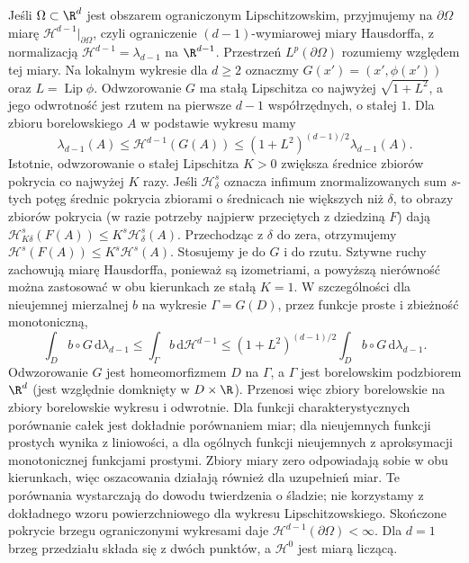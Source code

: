 \begin{definicja}
Jeśli $\Omega\subset\R^d$ jest obszarem ograniczonym Lipschitzowskim, przyjmujemy na $\partial\Omega$ miarę
$\mathcal H^{d-1}|_{\partial\Omega}$, czyli ograniczenie
$(d-1)$-wymiarowej miary Hausdorffa, z normalizacją
$\mathcal H^{d-1}=\lambda_{d-1}$ na $\R^{d-1}$.
Przestrzeń $L^p(\partial\Omega)$ rozumiemy względem
tej miary. Na lokalnym wykresie dla $d\ge2$ oznaczmy
$G(x')=(x',\phi(x'))$ oraz $L=\operatorname{Lip}\phi$.
Odwzorowanie $G$ ma stałą Lipschitza co najwyżej
$\sqrt{1+L^2}$, a jego odwrotność jest rzutem na
pierwsze $d-1$ współrzędnych, o stałej $1$.
Dla zbioru borelowskiego $A$ w podstawie wykresu mamy
\[
 \lambda_{d-1}(A)\le\mathcal H^{d-1}(G(A))
 \le(1+L^2)^{(d-1)/2}\lambda_{d-1}(A).
\]
Istotnie, odwzorowanie o stałej Lipschitza $K>0$
zwiększa średnice zbiorów pokrycia co najwyżej $K$ razy.
Jeśli $\mathcal H^s_\delta$ oznacza infimum
znormalizowanych sum $s$-tych potęg średnic pokrycia
zbiorami o średnicach nie większych niż $\delta$,
to obrazy zbiorów pokrycia (w razie potrzeby najpierw
przeciętych z dziedziną $F$) dają
$\mathcal H^s_{K\delta}(F(A))\le K^s\mathcal H^s_\delta(A)$.
Przechodząc z $\delta$ do zera, otrzymujemy
$\mathcal H^s(F(A))\le K^s\mathcal H^s(A)$.
Stosujemy je do $G$ i do rzutu. Sztywne ruchy
zachowują miarę Hausdorffa, ponieważ są izometriami,
a powyższą nierówność można zastosować w obu kierunkach
ze stałą $K=1$.
W szczególności dla nieujemnej mierzalnej $b$ na wykresie
$\Gamma=G(D)$, przez funkcje proste i zbieżność monotoniczną,
\[
 \int_D b\circ G\,\mathrm d\lambda_{d-1}
 \le\int_\Gamma b\,\mathrm d\mathcal H^{d-1}
 \le(1+L^2)^{(d-1)/2}
       \int_D b\circ G\,\mathrm d\lambda_{d-1}.
\]
Odwzorowanie $G$ jest homeomorfizmem $D$ na $\Gamma$,
a $\Gamma$ jest borelowskim podzbiorem $\R^d$
(jest względnie domknięty w $D\times\R$).
Przenosi więc zbiory borelowskie na zbiory borelowskie
wykresu i odwrotnie. Dla funkcji charakterystycznych
porównanie całek jest dokładnie porównaniem miar;
dla nieujemnych funkcji prostych wynika z liniowości,
a dla ogólnych funkcji nieujemnych z aproksymacji
monotonicznej funkcjami prostymi.
Zbiory miary zero odpowiadają sobie w obu kierunkach,
więc oszacowania działają również dla uzupełnień miar.
Te porównania wystarczają do dowodu twierdzenia o śladzie;
nie korzystamy z dokładnego wzoru powierzchniowego
dla wykresu Lipschitzowskiego.
Skończone pokrycie brzegu ograniczonymi wykresami daje
$\mathcal H^{d-1}(\partial\Omega)<\infty$.
Dla $d=1$ brzeg przedziału składa się z dwóch punktów,
a $\mathcal H^0$ jest miarą liczącą.
\end{definicja}

